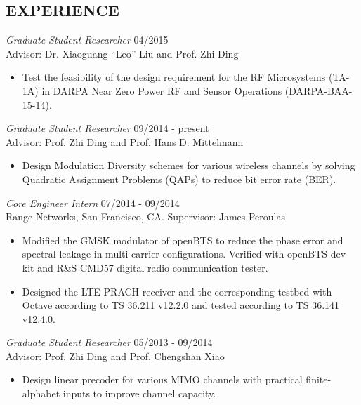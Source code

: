 \documentclass[margin]{res} %
\begin{document}
\begin{resume}
     
        \section{EXPERIENCE}
        {\sl Graduate Student Researcher} \hfill 04/2015 \\
        Advisor: Dr. Xiaoguang ``Leo'' Liu and Prof. Zhi Ding
        \begin{itemize} 
            \item Test the feasibility of the design requirement for the RF
            Microsystems (TA-1A) in DARPA Near Zero Power RF and Sensor
            Operations (DARPA-BAA-15-14).
        \end{itemize} 
        
        {\sl Graduate Student Researcher} \hfill 09/2014 - present \\
        Advisor: Prof. Zhi Ding and Prof. Hans D. Mittelmann
        \begin{itemize} 
            \item Design Modulation Diversity schemes for various wireless
            channels by solving Quadratic Assignment Problems (QAPs) to
            reduce bit error rate (BER).
        \end{itemize} 
        
        {\sl Core Engineer Intern} \hfill 07/2014 - 09/2014 \\
        Range Networks, San Francisco, CA. Supervisor: James Peroulas
        \begin{itemize} \itemsep -2pt %
            \item Modified the GMSK modulator of openBTS to reduce the phase
            error and spectral leakage in multi-carrier configurations. Verified
            with openBTS dev kit and R\&S CMD57 digital radio communication
            tester.
            \item Designed the LTE PRACH receiver and the corresponding testbed with
            Octave according to TS 36.211 v12.2.0 and tested according to TS 36.141
            v12.4.0.
        \end{itemize}
     
        {\sl Graduate Student Researcher} \hfill 05/2013 - 09/2014 \\
        Advisor: Prof. Zhi Ding and Prof. Chengshan Xiao 
        \begin{itemize} 
            \item Design linear precoder for various MIMO channels with
            practical finite-alphabet inputs to improve channel capacity.
        \end{itemize} 
        

\end{resume}
\end{document}
